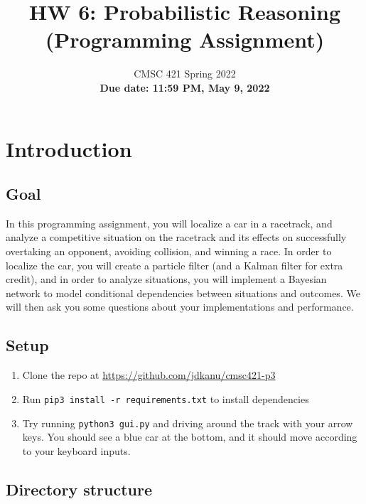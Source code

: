 \documentclass[a4paper]{article}
\title{HW 6: Probabilistic Reasoning\\ (Programming Assignment)}
\author{CMSC 421 Spring 2022\\
\textbf{Due date: 11:59 PM, May 9, 2022}}
\date{}
\begin{document}
\maketitle

\section*{Introduction}

\subsection*{Goal}

In this programming assignment, you will localize a car in a racetrack, and analyze a competitive situation on the racetrack and its effects on successfully overtaking an opponent, avoiding collision, and winning a race. In order to localize the car, you will create a particle filter (and a Kalman filter for extra credit), and in order to analyze situations, you will implement a Bayesian network to model conditional dependencies between situations and outcomes. We will then ask you some questions about your implementations and performance.

\subsection*{Setup}

\begin{enumerate}
    \item Clone the repo at \url{https://github.com/jdkanu/cmsc421-p3}
    \item Run \texttt{pip3 install -r requirements.txt} to install dependencies
    \item Try running \texttt{python3 gui.py} and driving around the track with your arrow keys. You should see a blue car at the bottom, and it should move according to your keyboard inputs.
\end{enumerate}

\subsection*{Directory structure}
\end{document}
